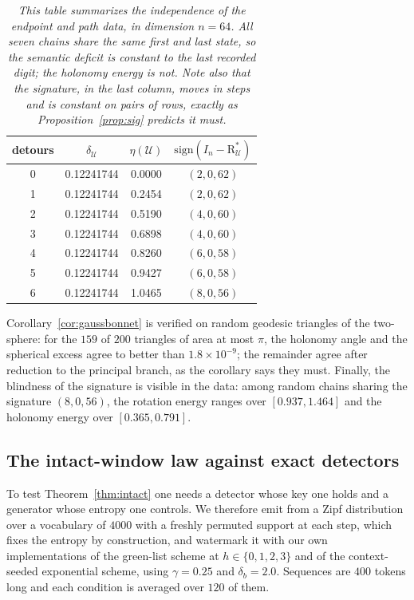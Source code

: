 \documentclass{article}
\theoremstyle{plain}
\theoremstyle{definition}
\numberwithin{equation}{section}
\newcommand{\sgn}{\mathrm{sign}}
\newcommand{\Uc}{\mathcal{U}}
\begin{document}
\begin{table}[t]
\centering
\small
\begin{tabular}{cccc}
\toprule
detours & $\delta_\Uc$ & $\eta(\Uc)$ & $\sgn(I_n-\mathrm{R}^{*}_\Uc)$\\
\midrule
0 & 0.12241744 & 0.0000 & $(2,0,62)$\\
1 & 0.12241744 & 0.2454 & $(2,0,62)$\\
2 & 0.12241744 & 0.5190 & $(4,0,60)$\\
3 & 0.12241744 & 0.6898 & $(4,0,60)$\\
4 & 0.12241744 & 0.8260 & $(6,0,58)$\\
5 & 0.12241744 & 0.9427 & $(6,0,58)$\\
6 & 0.12241744 & 1.0465 & $(8,0,56)$\\
\bottomrule
\end{tabular}
\caption{\emph{This table summarizes the independence of the endpoint
and path data, in dimension $n=64$. All seven chains share the same
first and last state, so the semantic deficit is constant to the last
recorded digit; the holonomy energy is not. Note also that the
signature, in the last column, moves in steps and is constant on pairs
of rows, exactly as Proposition~\ref{prop:sig} predicts it must.}}
\label{tab:realisability}
\end{table}

Corollary~\ref{cor:gaussbonnet} is verified on random geodesic triangles
of the two-sphere: for the $159$ of $200$ triangles of area at most
$\pi$, the holonomy angle and the spherical excess agree to better than
$1.8\times 10^{-9}$; the remainder agree after reduction to the
principal branch, as the corollary says they must. Finally, the
blindness of the signature is visible in the data: among random chains
sharing the signature $(8,0,56)$, the rotation energy ranges over
$[0.937,1.464]$ and the holonomy energy over $[0.365,0.791]$.

\subsection{The intact-window law against exact detectors}

To test Theorem~\ref{thm:intact} one needs a detector whose key one
holds and a generator whose entropy one controls. We therefore emit
from a Zipf distribution over a vocabulary of $4000$ with a freshly
permuted support at each step, which fixes the entropy by construction,
and watermark it with our own implementations of the green-list scheme
at $h \in \{0,1,2,3\}$ and of the context-seeded exponential scheme,
using $\gamma = 0.25$ and $\delta_b = 2.0$. Sequences are $400$ tokens
long and each condition is averaged over $120$ of them.
\end{document}
